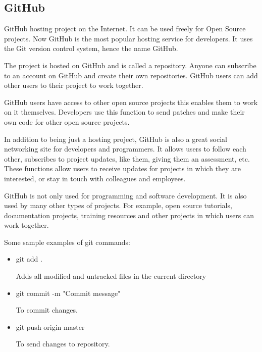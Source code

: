 \subsection{GitHub}
GitHub hosting project on the Internet. It can be used freely for Open Source projects. Now GitHub is the most popular hosting service for developers. It uses the Git version control system, hence the name GitHub.\par

The project is hosted on GitHub and is called a repository. Anyone can subscribe to an account on GitHub and create their own repositories. GitHub users can add other users to their project to work together.\par

GitHub users have access to other open source projects this enables them to work on it themselves. Developers use this function to send patches and make their own code for other open source projects.\par 

In addition to being just a hosting project, GitHub is also a great social networking site for developers and programmers. It allows users to follow each other, subscribes to project updates, like them, giving them an assessment, etc. These functions allow users to receive updates for projects in which they are interested, or stay in touch with colleagues and employees.\par

GitHub is not only used for programming and software development. It is also used by many other types of projects. For example, open source tutorials, documentation projects, training resources and other projects in which users can work together.\cite{GitHub}\par

Some sample examples of git commands:
\begin{itemize}

    \item git add .\par
    Adds all modified and untracked files in the current directory
    
    \item git commit -m "Commit message"\par
    To commit changes.
    
    \item git push origin master\par
    To send changes to repository. 
\end{itemize}

